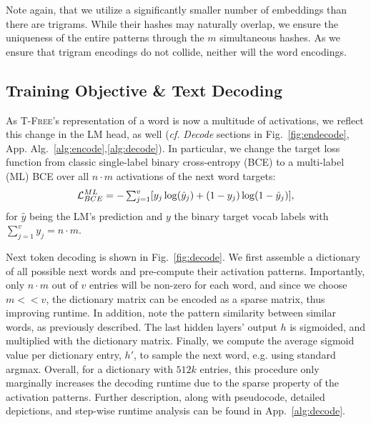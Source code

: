 \documentclass[11pt]{article}
\newcommand{\ps}[1]{\textcolor{purple}{PS: #1}}
\newcommand{\bd}[1]{\textcolor{pink}{BD: #1}}
\newcommand{\method}{\textsc{T-Free}}
\begin{document}
Note again, that we utilize a significantly smaller number of embeddings than there are trigrams. While their hashes may naturally overlap, we ensure the uniqueness of the  entire patterns through the $m$ simultaneous hashes. As we ensure that trigram encodings do not collide, neither will the word encodings.

\subsection{Training Objective \& Text Decoding}

As \method's representation of a word is now a multitude of activations, we reflect this change in the LM head, as well (\emph{cf.} \textit{Decode} sections in Fig.~\ref{fig:endecode}, App. Alg.~\ref{alg:encode},\ref{alg:decode}).
In particular, we change the target loss function from classic single-label binary cross-entropy (BCE) to a multi-label (ML) BCE over all $n\cdot m$ activations of the next word targets: 
\begin{equation*}
\small\mathcal{L}^{ML}_{BCE} \small\textstyle = - \sum_{j=1}^{v} [y_{j} \log(\hat{y}_{j}) + (1-y_j)\log(1-\hat{y}_{j})],
\end{equation*}
for $\hat{y}$ being the LM's prediction and  $y$ the binary  target vocab labels with $\sum_{j=1}^{v} y_j  =  n\cdot m$.

Next token decoding is shown in Fig.~\ref{fig:decode}. We first assemble a dictionary of all possible next words and pre-compute their activation patterns.  
Importantly, only $n\cdot m$ out of $v$ entries will be non-zero for each word, and since we choose $m <\!< v$, the dictionary matrix can be encoded as a sparse matrix, thus improving runtime.
In addition, note the pattern similarity between similar words, as previously described.
The last hidden layers' output $h$ is sigmoided, and multiplied with the dictionary matrix.
Finally, we compute the average sigmoid value per dictionary entry, $h'$, to sample the next word, e.g. using standard argmax. Overall, for a dictionary with $512k$ entries, this procedure only marginally increases the decoding runtime due to the sparse property of the activation patterns. Further description, along with pseudocode, detailed depictions, and step-wise runtime analysis can be found in App.~\ref{alg:decode}. 
\end{document}
